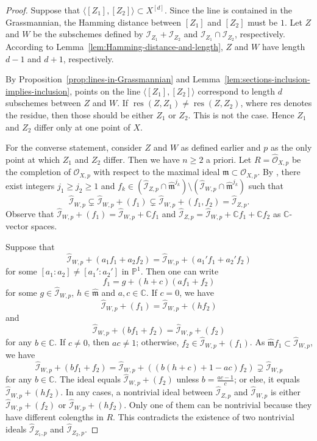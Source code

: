 \documentclass[a4paper]{amsart}
\numberwithin{equation}{section}
\theoremstyle{plain}
\theoremstyle{definition}
\theoremstyle{remark}
\numberwithin{figure}{section}
\numberwithin{table}{section}
\numberwithin{equation}{section}
\def \CC {\mathbb{C}}
\def \PP {\mathbb{P}}
\def \Ical {\mathcal{I}}
\def \Ocal {\mathcal{O}}
\def \mfr {\mathfrak{m}}
\DeclareMathOperator{\res}{res}
\begin{document}
\begin{proof}
    Suppose that $\langle [Z_1], [Z_2] \rangle \subset X^{[d]}$.
    Since the line is contained in the Grassmannian, the Hamming distance between $[Z_1]$ and $[Z_2]$ must be $1$.
    Let $Z$ and $W$ be the subschemes defined by $\Ical_{Z_1} + \Ical_{Z_2}$ and $\Ical_{Z_1} \cap \Ical_{Z_2}$, respectively.
    According to Lemma~\ref{lem:Hamming-distance-and-length}, $Z$ and $W$ have length $d-1$ and $d+1$, respectively.
    
    By Proposition~\ref{prop:lines-in-Grassmannian} and Lemma~\ref{lem:sections-inclusion-implies-inclusion}, points on the line $\langle [Z_1], [Z_2] \rangle$ correspond to length $d$ subschemes between $Z$ and $W$.
    If $\res(Z,Z_1) \neq \res(Z,Z_2)$, where $\mathrm{res}$ denotes the residue, then those should be either $Z_1$ or $Z_2$.
    This is not the case.
    Hence $Z_1$ and $Z_2$ differ only at one point of $X$.

    For the converse statement, consider $Z$ and $W$ as defined earlier and $p$ as the only point at which $Z_1$ and $Z_2$ differ.
    Then we have $n \geq 2$ a priori.
    Let $R = \hat{\Ocal}_{X,p}$ be the completion of $\Ocal_{X,p}$ with respect to the maximal ideal $\mfr \subset \Ocal_{X,p}$.
    By \cite[Lemma~1.3.2.(1)]{Gottsche1994}, there exist integers $j_1 \geq j_2 \geq 1$ and $f_{k} \in (\hat{\Ical}_{Z,p} \cap \hat{\mfr}^{j_k}) \setminus (\hat{\Ical}_{W,p} \cap \hat{\mfr}^{j_k})$ such that
     \[
      \hat{\Ical}_{W,p} \subsetneq
      \hat{\Ical}_{W,p} + (f_{1}) \subsetneq
      \hat{\Ical}_{W,p} + (f_{1}, f_{2}) =
      \hat{\Ical}_{Z,p}.
     \]
    Observe that $\hat{\Ical}_{W,p}+(f_1)=\hat{\Ical}_{W,p}+\CC f_1$ and $\hat{\Ical}_{Z,p}=\hat{\Ical}_{W,p}+\CC f_1+\CC f_2$ as $\CC$-vector spaces.
    
    Suppose that
    \[
        \hat{\Ical}_{W,p} + (a_1f_1+a_2f_2) = \hat{\Ical}_{W,p} + (a_1'f_1+a_2'f_2)
    \]
    for some $[a_1:a_2]\neq [a_1':a_2']$ in $\PP^1$.
    Then one can write
     \[
      f_1=g + (h+c)(af_1+f_2)
     \]
    for some $g \in \hat{\Ical}_{W,p}$, $h \in \hat{\mfr}$ and $a, c \in \CC$.
    If $c = 0$, we have
     \[
      \hat{\Ical}_{W,p}+(f_1) = \hat{\Ical}_{W,p}+(hf_2)
     \]
    and
     \[
      \hat{\Ical}_{W,p}+(bf_1+f_2)=\hat{\Ical}_{W,p}+(f_2)
     \]
    for any $b \in \CC$.
    If $c \neq 0$, then $ac \neq 1$; otherwise, $f_2 \in \hat{\Ical}_{W,p} + (f_1)$.
    As $\hat{\mfr} f_1 \subset \hat{\Ical}_{W,p}$, we have
    \[
        \hat{\Ical}_{W,p} + (bf_1+f_2)
        =\hat{\Ical}_{W,p} +\left((b(h+c) +1-ac)f_2\right) \supsetneq \hat{\Ical}_{W,p}
    \]
    for any $b \in \CC$.
    The ideal equals $\hat{\Ical}_{W,p} +(f_2)$ unless $b=\frac{ac-1}{c}$; or else, it equals $\hat{\Ical}_{W,p} + (hf_2)$.
    In any cases, a nontrivial ideal between $\hat{\Ical}_{Z,p}$ and $\hat{\Ical}_{W,p}$ is either $\hat{\Ical}_{W,p} + (f_2)$ or $\hat{\Ical}_{W,p} + (hf_2)$.
    Only one of them can be nontrivial because they have different colengths in $R$.
    This contradicts the existence of two nontrivial ideals $\hat{\Ical}_{Z_1,p}$ and $\hat{\Ical}_{Z_2,p}$.


\end{proof}
\end{document}

